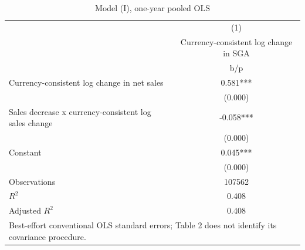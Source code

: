 \begin{table}[htbp]\centering
\def\sym#1{\ifmmode^{#1}\else\(^{#1}\)\fi}
\caption{Model (I), one-year pooled OLS}
\begin{tabular}{l*{1}{c}}
\hline\hline
                    &\multicolumn{1}{c}{(1)}\\
                    &\multicolumn{1}{c}{Currency-consistent log change in SGA}\\
                    &         b/p   \\
\hline
Currency-consistent log change in net sales&       0.581***\\
                    &     (0.000)   \\
Sales decrease x currency-consistent log sales change&      -0.058***\\
                    &     (0.000)   \\
Constant            &       0.045***\\
                    &     (0.000)   \\
\hline
Observations        &      107562   \\
\(R^{2}\)           &       0.408   \\
Adjusted \(R^{2}\)  &       0.408   \\
\hline\hline
\multicolumn{2}{l}{\footnotesize Best-effort conventional OLS standard errors; Table 2 does not identify its covariance procedure.}\\
\end{tabular}
\end{table}
